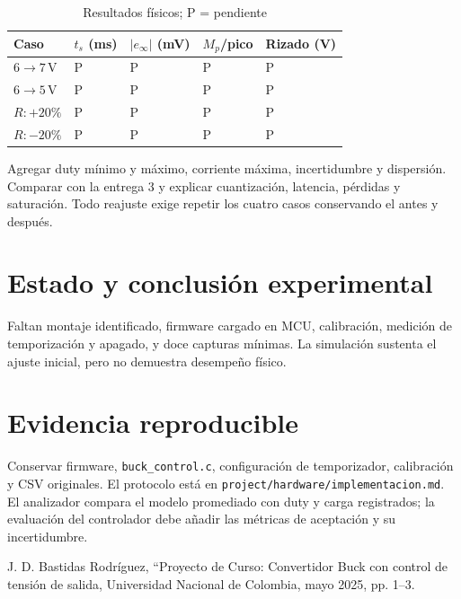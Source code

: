 \documentclass[conference,letterpaper]{IEEEtran}
\begin{document}
\begin{table}[H]\caption{Resultados físicos; P = pendiente}\label{tab:physical}\centering\footnotesize\setlength{\tabcolsep}{2pt}\renewcommand{\arraystretch}{1.18}\begin{tabularx}{\columnwidth}{LYYYY}\toprule
Caso & $t_s$ (ms) & $|e_\infty|$ (mV) & $M_p$/pico & Rizado (V)\\\midrule
$6\to7\,\mathrm{V}$ & P & P & P & P\\
$6\to5\,\mathrm{V}$ & P & P & P & P\\
$R:+20\%$ & P & P & P & P\\
$R:-20\%$ & P & P & P & P\\\bottomrule\end{tabularx}\end{table}
Agregar duty mínimo y máximo, corriente máxima, incertidumbre y dispersión. Comparar con la entrega 3 y explicar cuantización, latencia, pérdidas y saturación. Todo reajuste exige repetir los cuatro casos conservando el antes y después.

\section{Estado y conclusión experimental}
Faltan montaje identificado, firmware cargado en MCU, calibración, medición de temporización y apagado, y doce capturas mínimas. La simulación sustenta el ajuste inicial, pero no demuestra desempeño físico.

\appendices\section{Evidencia reproducible}\begingroup\raggedright
Conservar firmware, \texttt{buck\_control.c}, configuración de temporizador, calibración y CSV originales. El protocolo está en \texttt{project/hardware/implementacion.md}. El analizador compara el modelo promediado con duty y carga registrados; la evaluación del controlador debe añadir las métricas de aceptación y su incertidumbre.

\par\endgroup
\begin{thebibliography}{9}
J. D. Bastidas Rodríguez, ``Proyecto de Curso: Convertidor Buck con control de tensión de salida, Universidad Nacional de Colombia, mayo 2025, pp. 1--3.
\end{thebibliography}
\end{document}
